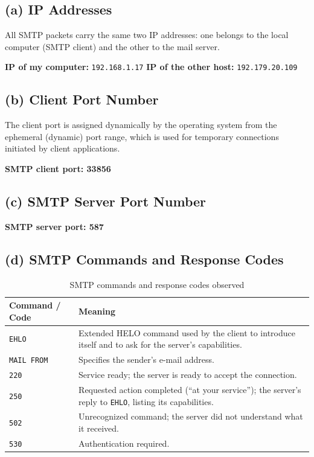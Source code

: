 \documentclass[12pt, a4paper]{report}
\begin{document}
\subsection*{(a) IP Addresses}
All SMTP packets carry the same two IP addresses: one belongs to the local computer (SMTP client) and the other to the mail server.

\textbf{IP of my computer:} \texttt{192.168.1.17} \hfill \textbf{IP of the other host:} \texttt{192.179.20.109}


\subsection*{(b) Client Port Number}
The client port is assigned dynamically by the operating system from the ephemeral (dynamic) port range, which is used for temporary connections initiated by client applications.

\textbf{SMTP client port: 33856}


\subsection*{(c) SMTP Server Port Number}

\textbf{SMTP server port: 587}

\subsection*{(d) SMTP Commands and Response Codes}
\begin{table}[H]
	\centering
	\begin{tabular}{|l|p{10cm}|}
		\hline
		\textbf{Command / Code} & \textbf{Meaning} \\ \hline
		\texttt{EHLO}      & Extended HELO command used by the client to introduce itself and to ask for the server's capabilities. \\ \hline
		\texttt{MAIL FROM} & Specifies the sender's e-mail address. \\ \hline
		\texttt{220} & Service ready; the server is ready to accept the connection. \\ \hline
		\texttt{250} & Requested action completed (``at your service''); the server's reply to \texttt{EHLO}, listing its capabilities. \\ \hline
		\texttt{502} & Unrecognized command; the server did not understand what it received. \\ \hline
		\texttt{530} & Authentication required. \\ \hline
	\end{tabular}
	\caption{SMTP commands and response codes observed}
\end{table}
\end{document}
